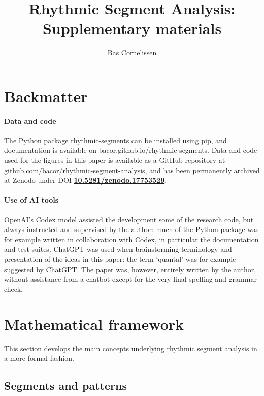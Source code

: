 \documentclass[a4paper]{article}
\title{Rhythmic Segment Analysis:\\Supplementary materials}
\author{Bas Cornelissen}
\date{}
\theoremstyle{definition}
\begin{document}
\maketitle

\tableofcontents

\section{Backmatter}

\paragraph{Data and code}

The Python package rhythmic-segments can be installed using pip, and documentation is available on bacor.github.io/rhythmic-segments. Data and code used for the figures in this paper is available as a GitHub repository at \href{https://github.com/bacor/rhythmic-segment-analysis}{github.com/bacor/rhythmic-segment-analysis}, and has been permanently archived at Zenodo under DOI \href{https://doi.org/10.5281/zenodo.17753529}{\textbf{10.5281/zenodo.17753529}}.

\paragraph{Use of AI tools}

OpenAI’s Codex model assisted the development some of the research code, but always instructed and supervised by the author: much of the Python package was for example written in collaboration with Codex, in particular the documentation and test suites. ChatGPT was used when brainstorming terminology and presentation of the ideas in this paper: the term ‘quantal’ was for example suggested by ChatGPT. The paper was, however, entirely written by the author, without assistance from a chatbot except for the very final spelling and grammar check.

\newpage

\section{Mathematical framework}

This section develops the main concepts underlying rhythmic segment analysis in a more formal fashion.

\subsection{Segments and patterns}
\end{document}
